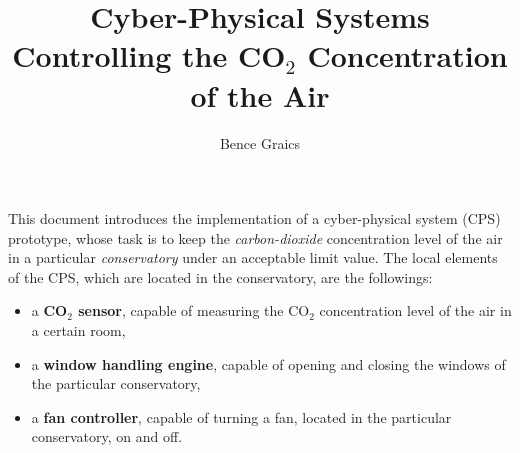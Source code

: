 \documentclass[a4paper, 11pt]{article}
\begin{document}
	
	\newcommand{\specialcell}[2][c]{%
		\begin{tabular}[#1]{@{}c@{}}#2\end{tabular}}
	
	\newenvironment*{mytable}[3]{
		\begin{table}[htbp]	
			\caption{#1}          
			\label{tab:#2}            
			\center%
			\begin{tabular}{#3}
			}
			{
			\end{tabular}
		\end{table}
	}
	
	\pagestyle{plain}
	
	
	
	\nonfrenchspacing
	\setlength{\parindent}{0em}
	\setlength{\parskip}{0.45em}
	
	\title{Cyber-Physical Systems\\Controlling the CO$_2$ Concentration of the Air}
	\date{}
	\author{Bence Graics}	
	
	\maketitle
	
	This document introduces the implementation of a cyber-physical system (CPS) prototype, whose task is to keep the \emph{carbon-dioxide} concentration level of the air in a particular \emph{conservatory} under an acceptable limit value. The local elements of the CPS, which are located in the conservatory, are the followings:
	\begin{itemize}
		\item a \textbf{CO$_2$ sensor}, capable of measuring the CO$_2$ concentration level of the air in a certain room,
		\item a \textbf{window handling engine}, capable of opening and closing the windows of the particular conservatory,
		\item a \textbf{fan controller}, capable of turning a fan, located in the particular conservatory, on and off.
	\end{itemize}
	
\end{document}
